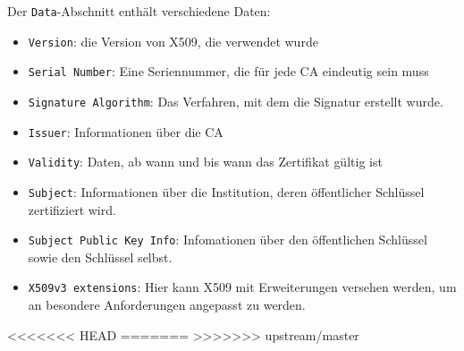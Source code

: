Der \texttt{Data}-Abschnitt enthält verschiedene Daten:
\begin{itemize}
\item \texttt{Version}: die Version von X509, die verwendet wurde
\item \texttt{Serial Number}: Eine Seriennummer, die für jede CA
  eindeutig sein muss
\item \texttt{Signature Algorithm}: Das Verfahren, mit dem die Signatur
  erstellt wurde.
\item \texttt{Issuer}: Informationen über die CA
\item \texttt{Validity}: Daten, ab wann und bis wann das Zertifikat
  gültig ist
\item \texttt{Subject}: Informationen über die Institution, deren
  öffentlicher Schlüssel zertifiziert wird.
\item \texttt{Subject Public Key Info}: Infomationen über den
  öffentlichen Schlüssel sowie den Schlüssel selbst.
\item \texttt{X509v3 extensions}: Hier kann X509 mit Erweiterungen
  versehen werden, um an besondere Anforderungen angepasst zu werden.
\end{itemize}
<<<<<<< HEAD
=======
>>>>>>> upstream/master
